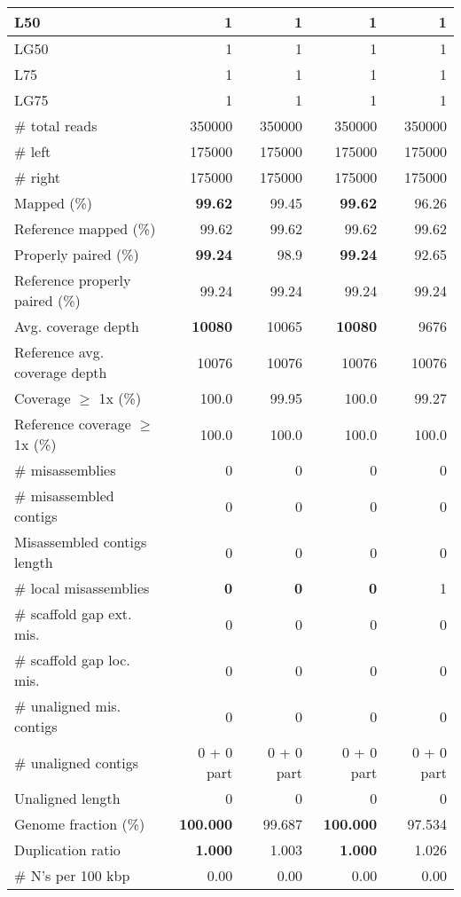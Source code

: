 \documentclass[12pt,a4paper]{article}
\begin{document}
\begin{table}[ht]
\begin{center}
\begin{tabular}{|l*{4}{|r}|}
L50 & 1 & 1 & 1 & 1 \\ \hline
LG50 & 1 & 1 & 1 & 1 \\ \hline
L75 & 1 & 1 & 1 & 1 \\ \hline
LG75 & 1 & 1 & 1 & 1 \\ \hline
\# total reads & 350000 & 350000 & 350000 & 350000 \\ \hline
\# left & 175000 & 175000 & 175000 & 175000 \\ \hline
\# right & 175000 & 175000 & 175000 & 175000 \\ \hline
Mapped (\%) & {\bf 99.62} & 99.45 & {\bf 99.62} & 96.26 \\ \hline
Reference mapped (\%) & 99.62 & 99.62 & 99.62 & 99.62 \\ \hline
Properly paired (\%) & {\bf 99.24} & 98.9 & {\bf 99.24} & 92.65 \\ \hline
Reference properly paired (\%) & 99.24 & 99.24 & 99.24 & 99.24 \\ \hline
Avg. coverage depth & {\bf 10080} & 10065 & {\bf 10080} & 9676 \\ \hline
Reference avg. coverage depth & 10076 & 10076 & 10076 & 10076 \\ \hline
Coverage $\geq$ 1x (\%) & 100.0 & 99.95 & 100.0 & 99.27 \\ \hline
Reference coverage $\geq$ 1x (\%) & 100.0 & 100.0 & 100.0 & 100.0 \\ \hline
\# misassemblies & 0 & 0 & 0 & 0 \\ \hline
\# misassembled contigs & 0 & 0 & 0 & 0 \\ \hline
Misassembled contigs length & 0 & 0 & 0 & 0 \\ \hline
\# local misassemblies & {\bf 0} & {\bf 0} & {\bf 0} & 1 \\ \hline
\# scaffold gap ext. mis. & 0 & 0 & 0 & 0 \\ \hline
\# scaffold gap loc. mis. & 0 & 0 & 0 & 0 \\ \hline
\# unaligned mis. contigs & 0 & 0 & 0 & 0 \\ \hline
\# unaligned contigs & 0 + 0 part & 0 + 0 part & 0 + 0 part & 0 + 0 part \\ \hline
Unaligned length & 0 & 0 & 0 & 0 \\ \hline
Genome fraction (\%) & {\bf 100.000} & 99.687 & {\bf 100.000} & 97.534 \\ \hline
Duplication ratio & {\bf 1.000} & 1.003 & {\bf 1.000} & 1.026 \\ \hline
\# N's per 100 kbp & 0.00 & 0.00 & 0.00 & 0.00 \\ \hline

\end{tabular}
\end{center}
\end{table}
\end{document}
